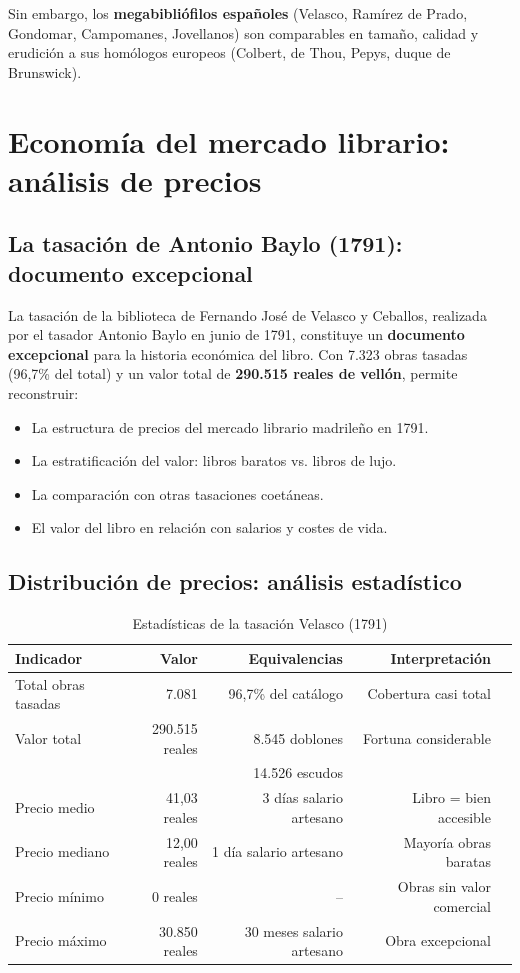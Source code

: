 \documentclass[11pt,a4paper]{article}
\begin{document}
Sin embargo, los \textbf{megabibliófilos españoles} (Velasco, Ramírez de Prado, Gondomar, Campomanes, Jovellanos) son comparables en tamaño, calidad y erudición a sus homólogos europeos (Colbert, de Thou, Pepys, duque de Brunswick).

\section{Economía del mercado librario: análisis de precios}

\subsection{La tasación de Antonio Baylo (1791): documento excepcional}

La tasación de la biblioteca de Fernando José de Velasco y Ceballos, realizada por el tasador Antonio Baylo en junio de 1791, constituye un \textbf{documento excepcional} para la historia económica del libro. Con 7.323 obras tasadas (96,7\% del total) y un valor total de \textbf{290.515 reales de vellón}, permite reconstruir:

\begin{itemize}
\item La estructura de precios del mercado librario madrileño en 1791.
\item La estratificación del valor: libros baratos vs. libros de lujo.
\item La comparación con otras tasaciones coetáneas.
\item El valor del libro en relación con salarios y costes de vida.
\end{itemize}

\subsection{Distribución de precios: análisis estadístico}

\begin{table}[h]
\centering
\begin{tabular}{lrrrr}
\toprule
\textbf{Indicador} & \textbf{Valor} & \textbf{Equivalencias} & \textbf{Interpretación} \\
\midrule
Total obras tasadas & 7.081 & 96,7\% del catálogo & Cobertura casi total \\
Valor total & 290.515 reales & 8.545 doblones & Fortuna considerable \\
 & & 14.526 escudos & \\
Precio medio & 41,03 reales & 3 días salario artesano & Libro = bien accesible \\
Precio mediano & 12,00 reales & 1 día salario artesano & Mayoría obras baratas \\
Precio mínimo & 0 reales & -- & Obras sin valor comercial \\
Precio máximo & 30.850 reales & 30 meses salario artesano & Obra excepcional \\
\bottomrule
\end{tabular}
\caption{Estadísticas de la tasación Velasco (1791)}
\end{table}
\end{document}
